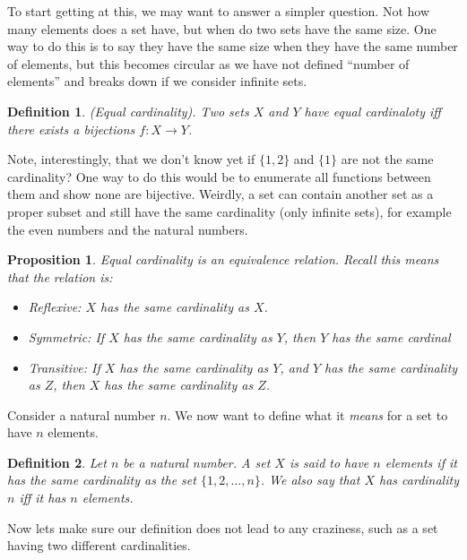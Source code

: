 \documentclass{article}
\newtheorem{definition}{Definition}[subsection]
\newtheorem{proposition}{Proposition}[subsection]
\let\it\textit
\begin{document}
To start getting at this, we may want to answer a simpler question.
Not how many elements does a set have, but when do two 
sets have the same size. One way to do this 
is to say they have the same size when they have the same
number of elements, but this becomes circular as we have 
not defined ``number of elements'' and breaks down if 
we consider infinite sets.

\begin{definition}
	(Equal cardinality). Two sets $X$ and $Y$ have equal cardinaloty 
	iff there exists a bijections $f: X \to Y$. 
\end{definition}

Note, interestingly, that we don't know yet if $\{1,2\}$ and $\{1\}$ are 
not the same cardinality? One way to do this would be to enumerate all functions 
between them and show none are bijective. Weirdly, a set can contain 
another set as a proper subset and still have the same cardinality (only 
infinite sets), for example the even numbers and the natural numbers.

\begin{proposition}
	Equal cardinality is an equivalence relation. Recall this means 
	that the relation is: 
	\begin{itemize}
		\item Reflexive: $X$ has the same cardinality as $X$.
		\item Symmetric: If $X$ has the same cardinality as $Y$, then 
			$Y$ has the same cardinal	
		\item Transitive: If $X$ has the same cardinality as $Y$, and 
			$Y$ has the same cardinality as $Z$, then $X$ has the same 
			cardinality as $Z$.
	\end{itemize}
\end{proposition}

Consider a natural number $n$. We now want to define what it \it{means} 
for a set to have $n$ elements.

\begin{definition}
	Let $n$ be a natural number. A set $X$ is said to have $n$ 
	elements if it has the same cardinality as the set 
	$\{1,2,\dots,n\}$. We also say that $X$ has cardinality $n$ 
	iff it has $n$ elements.
\end{definition}

Now lets make sure our definition does not lead to any craziness, such as
a set having two different cardinalities.
\end{document}
